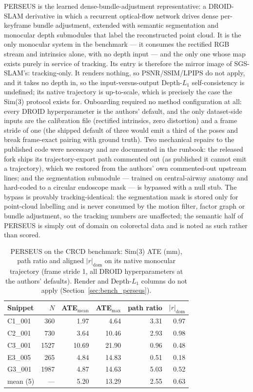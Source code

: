 PERSEUS \cite{perseus} is the learned dense-bundle-adjustment representative:
a DROID-SLAM \cite{teed2021droid} derivative in which a recurrent optical-flow
network drives dense per-keyframe bundle adjustment, extended with semantic
segmentation and monocular depth submodules that label the reconstructed point
cloud. It is the only monocular system in the benchmark --- it consumes the
rectified RGB stream and intrinsics alone, with no depth input --- and the
only one whose map exists purely in service of tracking. Its entry is
therefore the mirror image of SGS-SLAM's: tracking-only. It renders nothing,
so PSNR/SSIM/LPIPS do not apply, and it takes no depth in, so the
input-versus-output Depth-$L_1$ self-consistency is undefined; its native
trajectory is up-to-scale, which is precisely the case the Sim(3) protocol
exists for. Onboarding required no method configuration at all: every DROID
hyperparameter is the authors' default, and the only dataset-side inputs are
the calibration file (rectified intrinsics, zero distortion) and a frame
stride of one (the shipped default of three would emit a third of the poses
and break frame-exact pairing with ground truth). Two mechanical repairs to
the published code were necessary and are documented in the runbook: the
released fork ships its trajectory-export path commented out (as published it
cannot emit a trajectory), which we restored from the authors' own
commented-out upstream lines; and the segmentation submodule --- trained on
central-airway anatomy and hard-coded to a circular endoscope mask --- is
bypassed with a null stub. The bypass is provably tracking-identical: the
segmentation mask is stored only for point-cloud labelling and is never
consumed by the motion filter, factor graph or bundle adjustment, so the
tracking numbers are unaffected; the semantic half of PERSEUS is simply
out of domain on colorectal data and is noted as such rather than scored.

\begin{table}[t]
\centering
\caption{PERSEUS on the CRCD benchmark: Sim(3) ATE (mm), path ratio and
aligned $|r|_{\mathrm{dom}}$ on its native monocular trajectory (frame stride
1, all DROID hyperparameters at the authors' defaults). Render and
Depth-$L_1$ columns do not apply (Section~\ref{sec:bench_perseus}).}
\label{tab:bench_perseus}
\small
\begin{tabular}{l r rrrr}
\toprule
Snippet & $N$ & ATE$_{\mathrm{mean}}$ & ATE$_{\mathrm{max}}$ & path ratio &
$|r|_{\mathrm{dom}}$ \\
\midrule
C1\_001 &  360 &  1.97 &  4.64 & 3.31 & 0.97 \\
C2\_001 &  730 &  3.64 & 10.46 & 2.93 & 0.98 \\
C3\_001 & 1527 & 10.69 & 21.90 & 0.96 & 0.48 \\
E3\_005 &  265 &  4.84 & 14.83 & 0.51 & 0.18 \\
G3\_001 & 1987 &  4.87 & 14.63 & 5.03 & 0.52 \\
\midrule
mean (5) & --- & 5.20 & 13.29 & 2.55 & 0.63 \\
\bottomrule
\end{tabular}
\end{table}

